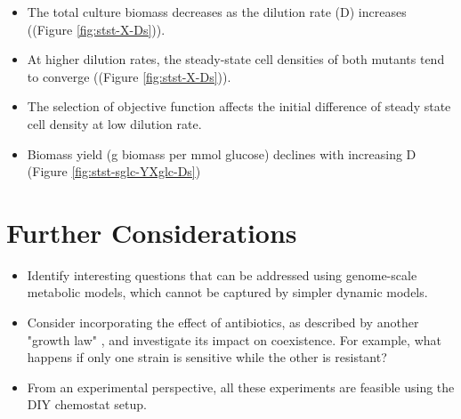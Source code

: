 \documentclass[11pt, letterpaper]{article}
\begin{document}
\begin{itemize}
    \item 
    The total culture biomass decreases as the dilution rate (D) increases ((Figure \ref{fig:stst-X-Ds})). 
    \item 
    At higher dilution rates, the steady-state cell densities of both mutants tend to converge ((Figure \ref{fig:stst-X-Ds})). 
    \item 
    The selection of objective function affects the initial difference of steady state cell density at low dilution rate. 
    \item 
    Biomass yield (g biomass per mmol glucose) declines with increasing D (Figure \ref{fig:stst-sglc-YXglc-Ds})
    
\end{itemize}




\section{Further Considerations}

\begin{itemize}
  \item 
  Identify interesting questions that can be addressed using genome-scale metabolic models, which cannot be captured by simpler dynamic models.
  
  \item 
  Consider incorporating the effect of antibiotics, as described by another "growth law" \cite{grilli2025notes}, and investigate its impact on coexistence.
  For example, what happens if only one strain is sensitive while the other is resistant?
  
  \item 
  From an experimental perspective, all these experiments are feasible using the DIY chemostat setup.
\end{itemize}




	
\end{document}
